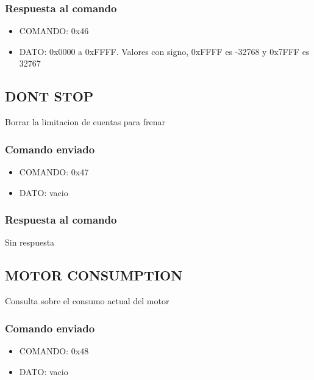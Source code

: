 \documentclass[a4paper,11pt]{article}
\begin{document}
\subsubsection*{Respuesta al comando}
\label{get_encoder_to_stop_respuesta}

\begin{itemize}
	\item{COMANDO:} 0x46
	\item{DATO:} 0x0000 a 0xFFFF. Valores con signo, 0xFFFF es -32768 y 0x7FFF es 32767
\end{itemize}

\subsection{DONT STOP}
\label{dont_stop}

Borrar la limitacion de cuentas para frenar

\subsubsection*{Comando enviado}
\label{dont_stop_comando_enviado}

\begin{itemize}
	\item{COMANDO:} 0x47
	\item{DATO:} vacio
\end{itemize}

\subsubsection*{Respuesta al comando}
\label{dont_stop_respuesta}

Sin respuesta

\subsection{MOTOR CONSUMPTION}
\label{motor_consumption}

Consulta sobre el consumo actual del motor

\subsubsection*{Comando enviado}
\label{motor_consumption_comando_enviado}

\begin{itemize}
	\item{COMANDO:} 0x48
	\item{DATO:} vacio
\end{itemize}
\end{document}
